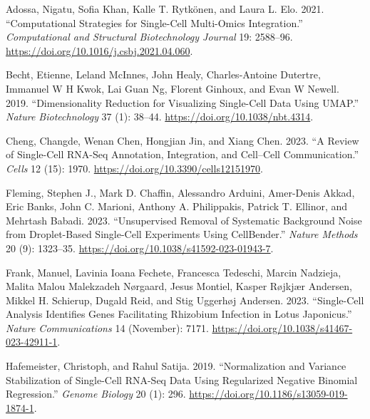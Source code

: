 \documentclass[
  letterpaper,
  DIV=11,
  numbers=noendperiod]{scrartcl}
\newlength{\cslhangindent}
\newlength{\cslentryspacingunit} %
\newenvironment{CSLReferences}[2] %
 {%
  \setlength{\parindent}{0pt}
  \ifodd #1
  \let\oldpar\par
  \def\par{\hangindent=\cslhangindent\oldpar}
  \fi
  \setlength{\parskip}{#2\cslentryspacingunit}
 }%
 {}
\begin{document}
\hypertarget{refs}{}
\begin{CSLReferences}{1}{0}
\leavevmode{}%
Adossa, Nigatu, Sofia Khan, Kalle T. Rytkönen, and Laura L. Elo. 2021.
{``Computational Strategies for Single-Cell Multi-Omics Integration.''}
\emph{Computational and Structural Biotechnology Journal} 19: 2588--96.
\url{https://doi.org/10.1016/j.csbj.2021.04.060}.

\leavevmode{}%
Becht, Etienne, Leland McInnes, John Healy, Charles-Antoine Dutertre,
Immanuel W H Kwok, Lai Guan Ng, Florent Ginhoux, and Evan W Newell.
2019. {``Dimensionality Reduction for Visualizing Single-Cell Data Using
{UMAP}.''} \emph{Nature Biotechnology} 37 (1): 38--44.
\url{https://doi.org/10.1038/nbt.4314}.

\leavevmode{}%
Cheng, Changde, Wenan Chen, Hongjian Jin, and Xiang Chen. 2023. {``A
{Review} of {Single}-{Cell} {RNA}-{Seq} {Annotation}, {Integration}, and
{Cell}--{Cell} {Communication}.''} \emph{Cells} 12 (15): 1970.
\url{https://doi.org/10.3390/cells12151970}.

\leavevmode{}%
Fleming, Stephen J., Mark D. Chaffin, Alessandro Arduini, Amer-Denis
Akkad, Eric Banks, John C. Marioni, Anthony A. Philippakis, Patrick T.
Ellinor, and Mehrtash Babadi. 2023. {``Unsupervised Removal of
Systematic Background Noise from Droplet-Based Single-Cell Experiments
Using {CellBender}.''} \emph{Nature Methods} 20 (9): 1323--35.
\url{https://doi.org/10.1038/s41592-023-01943-7}.

\leavevmode{}%
Frank, Manuel, Lavinia Ioana Fechete, Francesca Tedeschi, Marcin
Nadzieja, Malita Malou Malekzadeh Nørgaard, Jesus Montiel, Kasper
Røjkjær Andersen, Mikkel H. Schierup, Dugald Reid, and Stig Uggerhøj
Andersen. 2023. {``Single-Cell Analysis Identifies Genes Facilitating
Rhizobium Infection in {Lotus} Japonicus.''} \emph{Nature
Communications} 14 (November): 7171.
\url{https://doi.org/10.1038/s41467-023-42911-1}.

\leavevmode{}%
Hafemeister, Christoph, and Rahul Satija. 2019. {``Normalization and
Variance Stabilization of Single-Cell {RNA}-Seq Data Using Regularized
Negative Binomial Regression.''} \emph{Genome Biology} 20 (1): 296.
\url{https://doi.org/10.1186/s13059-019-1874-1}.


\end{CSLReferences}
\end{document}
